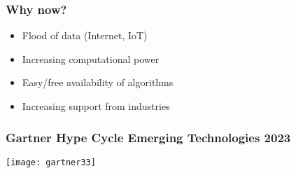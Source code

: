 \begin{frame}[fragile]\frametitle{Why now?}
\begin{itemize}
\item Flood of data (Internet, IoT)
\item Increasing computational power
\item Easy/free availability of algorithms 
\item Increasing support from industries
\end{itemize}
\end{frame}


	


	


	


\begin{frame}[fragile]\frametitle{Gartner Hype Cycle Emerging Technologies 2023}
	
	\begin{center}
	\texttt{[image: gartner33]}
	\end{center}

\end{frame}

